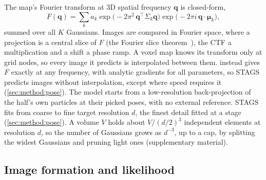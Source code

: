 The map's Fourier transform at 3D spatial frequency $\mathbf{q}$ is closed-form,
\begin{equation}
F(\mathbf{q})=\sum_{k}a_k\exp\!\big(-2\pi^2\,\mathbf{q}^{\top}\Sigma_k\mathbf{q}\big)\exp\!\big(-2\pi i\,\mathbf{q}\cdot\bm{\mu}_k\big),
\label{eq:ft}
\end{equation}
summed over all $K$ Gaussians.
Images are compared in Fourier space, where a projection is a central slice of $F$ (the Fourier slice theorem~\cite{bracewell1956strip}), the CTF a multiplication and a shift a phase ramp.
A voxel map knows its transform only at grid nodes, so every image it predicts is interpolated between them.
 instead gives $F$ exactly at any frequency, with analytic gradients for all parameters, so STAGS predicts images without interpolation, except where speed requires it (\cref{sec:method:pose}).
The model starts from a low-resolution back-projection of the half's own particles at their picked poses, with no external reference.
STAGS fits from coarse to fine target resolution $d$, the finest detail fitted at a stage (\cref{sec:method:pose}).
A volume $V$ holds about $V/(d/2)^3$ independent elements at resolution $d$, so the number of Gaussians grows as $d^{-3}$, up to a cap, by splitting the widest Gaussians and pruning light ones (supplementary material).%

\subsection{Image formation and likelihood}
\label{sec:method:forward}


